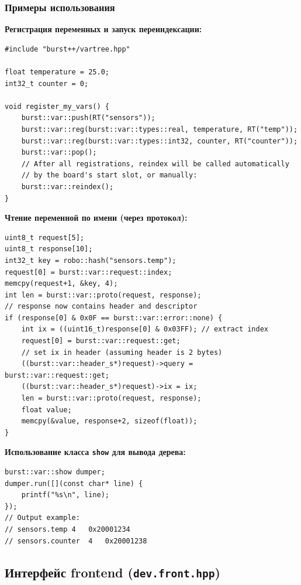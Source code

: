 \documentclass[a4paper,12pt]{article}
\begin{document}
\subsubsection{Примеры использования}

\textbf{Регистрация переменных и запуск переиндексации:}

\begin{lstlisting}[caption={Registering variables and reindexing}]
#include "burst++/vartree.hpp"

float temperature = 25.0;
int32_t counter = 0;

void register_my_vars() {
    burst::var::push(RT("sensors"));
    burst::var::reg(burst::var::types::real, temperature, RT("temp"));
    burst::var::reg(burst::var::types::int32, counter, RT("counter"));
    burst::var::pop();
    // After all registrations, reindex will be called automatically
    // by the board's start slot, or manually:
    burst::var::reindex();
}
\end{lstlisting}

\textbf{Чтение переменной по имени (через протокол):}

\begin{lstlisting}[caption={Protocol usage example}]
uint8_t request[5];
uint8_t response[10];
int32_t key = robo::hash("sensors.temp");
request[0] = burst::var::request::index;
memcpy(request+1, &key, 4);
int len = burst::var::proto(request, response);
// response now contains header and descriptor
if (response[0] & 0x0F == burst::var::error::none) {
    int ix = ((uint16_t)response[0] & 0x03FF); // extract index
    request[0] = burst::var::request::get;
    // set ix in header (assuming header is 2 bytes)
    ((burst::var::header_s*)request)->query = burst::var::request::get;
    ((burst::var::header_s*)request)->ix = ix;
    len = burst::var::proto(request, response);
    float value;
    memcpy(&value, response+2, sizeof(float));
}
\end{lstlisting}

\textbf{Использование класса \texttt{show} для вывода дерева:}

\begin{lstlisting}[caption={Dumping the variable tree}]
burst::var::show dumper;
dumper.run([](const char* line) {
    printf("%s\n", line);
});
// Output example:
// sensors.temp	4	0x20001234
// sensors.counter	4	0x20001238
\end{lstlisting}

\subsection{Интерфейс frontend (\texttt{dev.front.hpp})}
\end{document}
